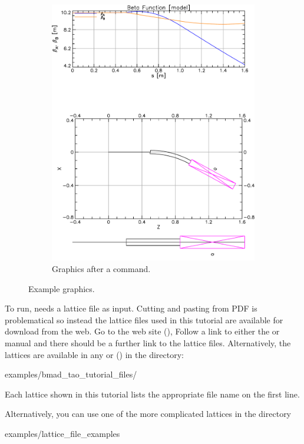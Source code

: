 \documentclass{hitec}
\begin{document}
\begin{figure}[tb]
\begin{subfigure}[b]{0.47\textwidth}
    \includegraphics[width=\textwidth]{lat-floor.pdf}
    \caption{Graphics after a  command.}
    \label{f:lat.floor}
  \end{subfigure}
  \caption{Example \tao graphics.}
\end{figure}

To run, \tao needs a lattice file as input.  Cutting and pasting from PDF is problematical so
instead the lattice files used in this tutorial are available for download from the web. Go to the
\bmad web site (), Follow a link to either the \bmad or \tao manual and there
should be a further link to the lattice files. Alternatively, the lattices are available in any
 or  () in the directory:
\begin{code}
examples/bmad_tao_tutorial_files/
\end{code}
Each lattice shown in this tutorial lists the appropriate file name on the first line.

Alternatively, you can use one of the more complicated lattices in the directory
\begin{code}
examples/lattice_file_examples
\end{code}
\end{document}
